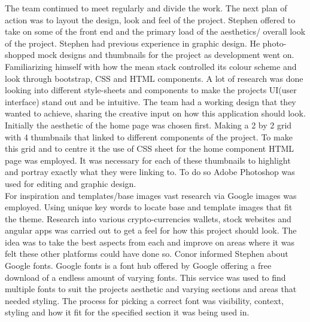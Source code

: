 The team continued to meet regularly and divide the work. The next plan of action was to layout the design, look and feel of the project. Stephen offered to take on some of the front end and the primary load of the aesthetics/ overall look of the project. Stephen had previous experience in graphic design. He photo-shopped mock designs and thumbnails for the project as development went on. Familiarizing himself with how the mean stack controlled its colour scheme and look through bootstrap, CSS and HTML components. A lot of research was done looking into different style-sheets and components to make the projects UI(user interface) stand out and be intuitive. The team had a working design that they wanted to achieve, sharing the creative input on how this application should look. Initially the aesthetic of the home page was chosen first. Making a 2 by 2 grid with 4 thumbnails that linked to different components of the project. To make this grid and to centre it the use of CSS sheet for the home component HTML page was employed. It was necessary for each of these thumbnails to highlight and portray exactly what they were linking to. To do so Adobe Photoshop was used for editing and graphic design. \\
For inspiration and templates/base images vast research via Google images was employed. Using unique key words to locate base and template images that fit the theme. Research into various crypto-currencies wallets, stock websites and angular apps was carried out to get a feel for how this project should look. The idea was to take the best aspects from each and improve on areas where it was felt these other platforms could have done so. Conor informed Stephen about Google fonts. Google fonts is a font hub offered by Google offering a free download of a endless amount of varying fonts. This service was used to find multiple fonts to suit the projects aesthetic and varying sections and areas that needed styling. The process for picking a correct font was visibility, context, styling and how it fit for the specified section it was being used in. 

